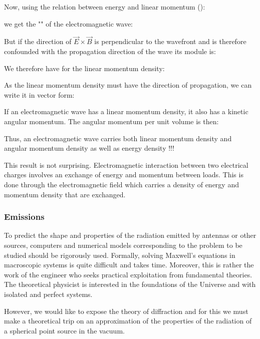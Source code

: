 	Now, using the relation between energy and linear momentum ():
	
	we get the "" of the electromagnetic wave:
	
	But if the direction of $\vec{E}\times\vec{B} $ is perpendicular to the wavefront and is therefore confounded with the propagation direction of the wave its module is:
	
	We therefore have for the linear momentum density:
	
	As the linear momentum density must have the direction of propagation, we can write it in vector form:
	
	If an electromagnetic wave has a linear momentum density, it also has a kinetic angular momentum. The angular momentum per unit volume is then:
	
	Thus, an electromagnetic wave carries both linear momentum density and angular momentum density as well as energy density !!!

	This result is not surprising. Electromagnetic interaction between two electrical charges involves an exchange of energy and momentum between loads. This is done through the electromagnetic field which carries a density of energy and momentum density that are exchanged.
		
	\pagebreak
	\subsubsection{Emissions}\label{electromagnetic emissions}
	To predict the shape and properties of the radiation emitted by antennas or other sources, computers and numerical models corresponding to the problem to be studied should be rigorously used. Formally, solving Maxwell's equations in macroscopic systems is quite difficult and takes time. Moreover, this is rather the work of the engineer who seeks practical exploitation from fundamental theories. The theoretical physicist is interested in the foundations of the Universe and with isolated and perfect systems.

	However, we would like to expose the theory of diffraction and for this we must make a theoretical trip on an approximation of the properties of the radiation of a spherical point source in the vacuum.

